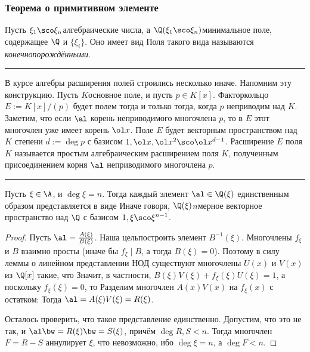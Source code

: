 \documentclass[a4paper]{article}
\newenvironment{petit}
{\par\smallskip\hrule\smallskip\footnotesize}{\par\smallskip\hrule\smallskip}
\begin{document}
\subsubsection{Теорема о примитивном элементе}

Пусть $\xi_1\sco \xi_n$\т  алгебраические числа, а $\Q(\xi_1\sco \xi_n)$\т  минимальное поле,
содержащее $\Q$ и $\{\xi_i\}$. Оно имеет вид
Поля такого вида называются \emph{конечнопорождёнными}.

\begin{petit}
В курсе алгебры расширения полей строились несколько иначе. Напомним эту конструкцию.
Пусть $K$\т основное поле, и пусть $p \in K[x]$. Факторкольцо $E := K[x]/(p)$ будет полем
тогда и только тогда, когда $p$ неприводим над $K$. Заметим, что если $\al$\т
корень неприводимого многочлена $p$, то в $E$ этот многочлен уже имеет корень $\ol x$.
Поле $E$ будет векторным пространством над $K$ степени $d := \deg p$ с базисом $1, \ol x, \ol x^2\sco \ol x^{d-1}$.
Расширение $E$ поля $K$ называется простым алгебраическим расширением поля $K$,
полученным присоединением корня $\al$ неприводимого многочлена $p$.
\end{petit}

\begin{lemma}
Пусть $\xi\in \A$, и $\deg\xi=n$. Тогда каждый элемент $\al\in\Q(\xi)$ единственным
образом представляется в виде
Иначе говоря, $\Q(\xi)$\т  $n$\д мерное векторное пространство над $\Q$ с базисом
$1,\xi\sco \xi^{n-1}$.
\end{lemma}
\begin{proof}
Пусть $\al=\frac{A(\xi)}{B(\xi)}$. Наша цель\т построить элемент $B^{-1}(\xi)$. Многочлены $f_{\xi}$ и $B$ взаимно просты (иначе бы $f_{\xi}\mid B$,
а тогда $B(\xi)=0$). Поэтому в силу леммы о линейном представлении НОД существуют многочлены
$U(x)$ и $V(x)$ из $\Q[x]$ такие, что
Значит, в частности, $B(\xi)V(\xi)+f_{\xi}(\xi)U(\xi)=1$, а поскольку $f_\xi(\xi) = 0$, то
Разделим многочлен $A(x)V(x)$ на $f_{\xi}(x)$ с остатком:
Тогда $\al=A(\xi)V(\xi)=R(\xi)$.

Осталось проверить, что такое представление единственно. Допустим, что это не так, и
$\al\bw=R(\xi)\bw=S(\xi)$, причём $\deg R,S<n$. Тогда многочлен $F=R-S$ аннулирует $\xi$,
что невозможно, ибо $\deg\xi=n$, а $\deg F < n$.
\end{proof}
\end{document}
